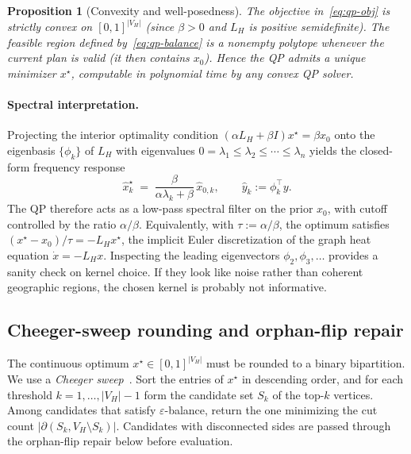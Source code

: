 \documentclass[11pt]{article}
\newtheorem{proposition}{Proposition}[section]
\begin{document}
\begin{proposition}[Convexity and well-posedness]\label{prop:convex}
The objective in~\eqref{eq:qp-obj} is strictly convex on
$[0,1]^{|V_H|}$ (since $\beta > 0$ and $L_H$ is positive semidefinite).
The feasible region defined by~\eqref{eq:qp-balance} is a nonempty
polytope whenever the current plan is valid (it then contains $x_0$).
Hence the QP admits a unique minimizer $x^\star$, computable in
polynomial time by any convex QP solver.
\end{proposition}

\paragraph{Spectral interpretation.} Projecting the interior optimality
condition $(\alpha L_H + \beta I) x^\star = \beta x_0$ onto the
eigenbasis $\{\phi_k\}$ of $L_H$ with eigenvalues
$0 = \lambda_1 \le \lambda_2 \le \cdots \le \lambda_n$ yields the
closed-form frequency response
\begin{equation}\label{eq:freq-response}
  \hat x^\star_k \;=\; \frac{\beta}{\alpha \lambda_k + \beta}\,
  \hat x_{0,k},
  \qquad \hat y_k := \phi_k^\top y.
\end{equation}
The QP therefore acts as a low-pass spectral filter on the prior $x_0$,
with cutoff controlled by the ratio $\alpha / \beta$. Equivalently, with
$\tau := \alpha / \beta$, the optimum satisfies
$(x^\star - x_0)/\tau = -L_H x^\star$, the implicit Euler
discretization of the graph heat equation $\dot x = -L_H x$. Inspecting
the leading eigenvectors $\phi_2, \phi_3, \ldots$ provides a sanity
check on kernel choice. If they look like noise rather than coherent
geographic regions, the chosen kernel is probably not informative.

\subsection{Cheeger-sweep rounding and orphan-flip repair}\label{sec:rounding}

The continuous optimum $x^\star \in [0,1]^{|V_H|}$ must be rounded to a
binary bipartition. We use a \emph{Cheeger sweep}~\cite{chung1997spectral}. Sort the entries of $x^\star$ in descending order, and for each
threshold $k = 1, \ldots, |V_H| - 1$ form the candidate set $S_k$ of the
top-$k$ vertices. Among candidates that satisfy $\varepsilon$-balance,
return the one minimizing the cut count
$|\partial(S_k, V_H \setminus S_k)|$. Candidates with disconnected sides
are passed through the orphan-flip repair below before evaluation.
\end{document}

